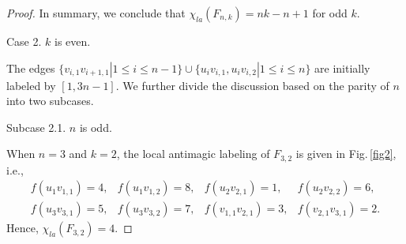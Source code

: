 \documentclass[12pt]{article}
\begin{document}
\begin{proof}

In summary, we conclude that $\chi_{la}(F_{n,k})=nk-n+1$ for odd $k$.

Case 2. $k$ is even.

The edges $\{v_{i,1}v_{i+1,1}|1\leq i\leq n-1\}\cup\{u_{i}v_{i,1},u_{i}v_{i,2}|1\leq i\leq n\}$ are initially labeled by $[1,3n-1]$. We further divide the discussion based on the parity of $n$ into two subcases.

Subcase 2.1. $n$ is odd.

When $n=3$ and $k=2$, the local antimagic labeling of $F_{3,2}$ is given in Fig.\,\ref{fig2}, i.e.,
\begin{equation*}
\begin{array}{llll}
f(u_{1}v_{1,1})=4, &f(u_{1}v_{1,2})=8,&f(u_{2}v_{2,1})=1, & f(u_{2}v_{2,2})=6,\\[3pt]
f(u_{3}v_{3,1})=5, &f(u_{3}v_{3,2})=7,&f(v_{1,1}v_{2,1})=3, &f(v_{2,1}v_{3,1})=2.
\end{array}
\end{equation*}
Hence, $\chi_{la}(F_{3,2})=4$.


\end{proof}
\end{document}
